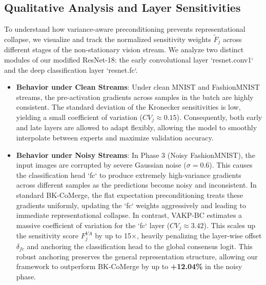 \documentclass{article}
\theoremstyle{plain}
\theoremstyle{definition}
\theoremstyle{remark}
\begin{document}
\subsection{Qualitative Analysis and Layer Sensitivities}
To understand how variance-aware preconditioning prevents representational collapse, we visualize and track the normalized sensitivity weights $\tilde{F}_j$ across different stages of the non-stationary vision stream. We analyze two distinct modules of our modified ResNet-18: the early convolutional layer `resnet.conv1` and the deep classification layer `resnet.fc`.
\begin{itemize}
    \item \textbf{Behavior under Clean Streams}: Under clean MNIST and FashionMNIST streams, the pre-activation gradients across samples in the batch are highly consistent. The standard deviation of the Kronecker sensitivities is low, yielding a small coefficient of variation ($CV_j \approx 0.15$). Consequently, both early and late layers are allowed to adapt flexibly, allowing the model to smoothly interpolate between experts and maximize validation accuracy.
    \item \textbf{Behavior under Noisy Streams}: In Phase 3 (Noisy FashionMNIST), the input images are corrupted by severe Gaussian noise ($\sigma = 0.6$). This causes the classification head `fc` to produce extremely high-variance gradients across different samples as the predictions become noisy and inconsistent. In standard BK-CoMerge, the flat expectation preconditioning treats these gradients uniformly, updating the `fc` weights aggressively and leading to immediate representational collapse. In contrast, VAKP-BC estimates a massive coefficient of variation for the `fc` layer ($CV_j \approx 3.42$). This scales up the sensitivity score $F_j^{VA}$ by up to 15$\times$, heavily penalizing the layer-wise offset $\delta_{fc}$ and anchoring the classification head to the global consensus logit. This robust anchoring preserves the general representation structure, allowing our framework to outperform BK-CoMerge by up to \textbf{+12.04\%} in the noisy phase.
\end{itemize}
\end{document}
